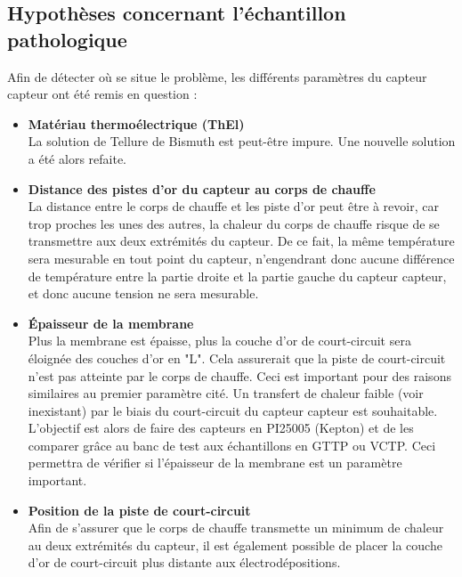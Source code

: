 \subsection{Hypothèses concernant l'échantillon pathologique}
\label{chap:hypotheses_echantillon_patho}
Afin de détecter où se situe le problème, les différents paramètres du capteur \gls{capteur} ont été remis en question :
\begin{itemize}
    \item \textbf{Matériau thermoélectrique (ThEl)}\\
          La solution de Tellure de Bismuth est peut-être impure. Une nouvelle solution a été alors refaite.
          
    \item \textbf{Distance des pistes d'or du capteur au corps de chauffe}\\
          La distance entre le corps de chauffe et les piste d'or peut être à revoir, car trop proches les unes des autres, la chaleur du corps
          de chauffe risque de se transmettre aux deux extrémités du capteur. De ce fait, la même température sera mesurable en tout point du
          capteur, n'engendrant donc aucune différence de température entre la partie droite et la partie gauche du capteur \gls{capteur}, et donc aucune
          tension ne sera mesurable.\\
          
    \item \textbf{Épaisseur de la membrane} \\
          Plus la membrane est épaisse, plus la couche d'or de court-circuit sera éloignée des couches d'or en "L". Cela assurerait que la piste 
          de court-circuit n'est pas atteinte par le corps de chauffe. Ceci est important pour des raisons similaires au premier paramètre cité. 
          Un transfert de chaleur faible (voir inexistant) par le biais du court-circuit du capteur \gls{capteur} est souhaitable. \\
          
          L'objectif est alors de faire des capteurs en PI25005 (Kepton) et de les comparer grâce au banc de test aux échantillons en GTTP ou VCTP.
          Ceci permettra de vérifier si l'épaisseur de la membrane est un paramètre important.\\
          
    \item \textbf{Position de la piste de court-circuit}\\
          Afin de s'assurer que le corps de chauffe transmette un minimum de chaleur au deux extrémités du capteur, il est également possible de 
          placer la couche d'or de court-circuit plus distante aux électrodépositions.\\
          

\end{itemize}
